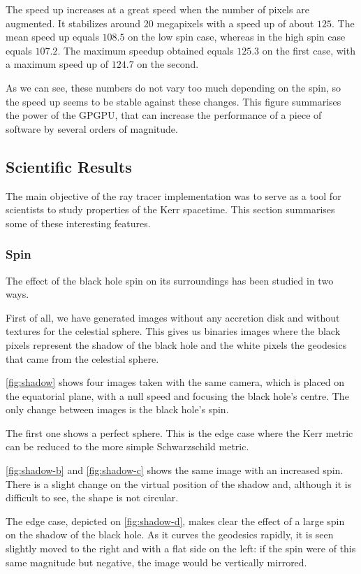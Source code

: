 The speed up increases at a great speed when the number of pixels are augmented. It stabilizes around 20 megapixels with a speed up of about $125$. The mean speed up equals $108.5$ on the low spin case, whereas in the high spin case equals $107.2$. The maximum speedup obtained equals $125.3$ on the first case, with a maximum speed up of $124.7$ on the second.

As we can see, these numbers do not vary too much depending on the spin, so the speed up seems to be stable against these changes. This figure summarises the power of the \ac{GPGPU}, that can increase the performance of a piece of software by several orders of magnitude.


\subsection{Scientific Results}

The main objective of the ray tracer implementation was to serve as a tool for scientists to study properties of the Kerr spacetime. This section summarises some of these interesting features.

\subsubsection*{Spin}

The effect of the black hole spin on its surroundings has been studied in two ways.

First of all, we have generated images without any accretion disk and without textures for the celestial sphere. This gives us binaries images where the black pixels represent the shadow of the black hole and the white pixels the geodesics that came from the celestial sphere.

\autoref{fig:shadow} shows four images taken with the same camera, which is placed on the equatorial plane, with a null speed and focusing the black hole's centre. The only change between images is the black hole's spin.

The first one shows a perfect sphere. This is the edge case where the Kerr metric can be reduced to the more simple Schwarzschild metric.

\autoref{fig:shadow-b} and \autoref{fig:shadow-c} shows the same image with an increased spin. There is a slight change on the virtual position of the shadow and, although it is difficult to see, the shape is not circular.

The edge case, depicted on \autoref{fig:shadow-d}, makes clear the effect of a large spin on the shadow of the black hole. As it curves the geodesics rapidly, it is seen slightly moved to the right and with a flat side on the left: if the spin were of this same magnitude but negative, the image would be vertically mirrored.

